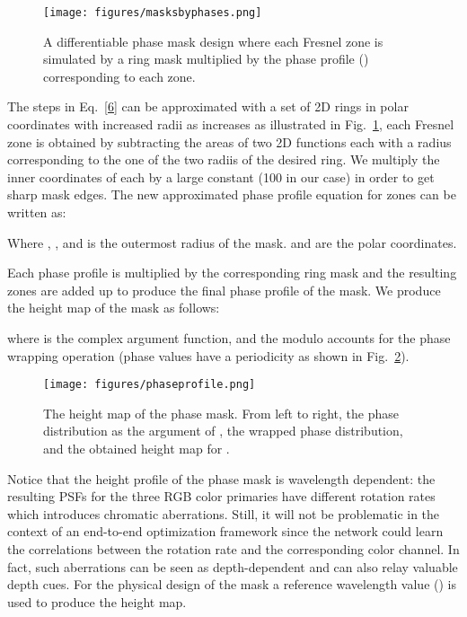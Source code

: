\documentclass[preprint,5p,twocolumn]{elsarticle}
\begin{document}
\begin{figure}[h!]
\centering
\texttt{[image: figures/masksbyphases.png]}
\caption{A differentiable phase mask design where each Fresnel zone is simulated by a ring mask multiplied by the phase profile () corresponding to each zone.}
\label{fig:masks}
\end{figure}

The steps in Eq.~\ref{6} can be approximated with a set of 2D rings in polar coordinates with increased radii as  increases as illustrated in Fig.~\ref{fig:masks}, each Fresnel zone is obtained by subtracting the areas of two 2D  functions each with a radius corresponding to the one of the two radiis of the desired ring. We multiply the inner coordinates of each  by a large constant (100 in our case) in order to get sharp mask edges. The new approximated phase profile equation for  zones can be written as:



Where , , and  is the outermost radius of the mask.  and  are the polar coordinates.

Each phase profile  is multiplied by the corresponding ring mask and the resulting zones are added up to produce the final phase profile of the mask. We produce the height map  of the mask as follows:



where  is the complex argument function, and the modulo accounts for the phase wrapping operation (phase values have a  periodicity as shown in  Fig.~\ref{fig:height}).

\begin{figure}[h!]
    \centering
    \texttt{[image: figures/phaseprofile.png]}
    \caption{The height map of the phase mask. From left to right, the phase distribution as the argument of , the  wrapped phase distribution, and the obtained height map for .}
    \label{fig:height}
\end{figure}

Notice that the height profile of the phase mask is wavelength dependent: the resulting PSFs for the three RGB color primaries have different rotation rates which introduces chromatic aberrations. Still, it will not be problematic in the context of an end-to-end optimization framework since the network could learn the correlations between the rotation rate and the corresponding color channel. In fact, such aberrations can be seen as depth-dependent and can also relay valuable depth cues. For the physical design of the mask a reference wavelength value () is used to produce the height map. 
\end{document}
